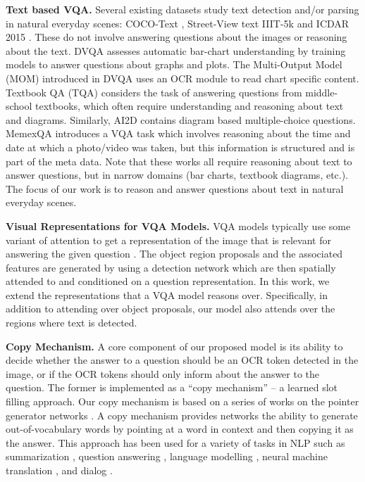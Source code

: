\documentclass[10pt,twocolumn,letterpaper]{article}
\begin{document}
\textbf{Text based VQA.} Several existing datasets study text detection and/or parsing in natural everyday scenes: COCO-Text \cite{veit2016coco}, Street-View text \cite{wang2010word} IIIT-5k \cite{mishra2012scene} and ICDAR 2015 \cite{karatzas2015icdar}. These do not involve answering questions about the images or reasoning about the text.
DVQA \cite{kafle2018dvqa} assesses automatic bar-chart understanding by training models to answer questions about graphs and plots. The Multi-Output Model (MOM) introduced in DVQA  uses an OCR module to read chart specific content. 
Textbook QA (TQA) \cite{kembhavi2017you} considers the task of answering questions from middle-school textbooks, which often require understanding and reasoning about text and diagrams. 
Similarly, AI2D \cite{kembhavi2016diagram} contains diagram based multiple-choice questions. MemexQA \cite{jiang2017memexqa} introduces a VQA task which involves reasoning about the time and date at which a photo/video was taken, but this information is structured and is part of the meta data.
Note that these works all require reasoning about text to answer questions, but in narrow domains (bar charts, textbook diagrams, etc.). The focus of our work is to reason and answer questions about text in natural everyday scenes. 

\textbf{Visual Representations for VQA Models.}
VQA models typically use some variant of attention to get a representation of the image that is relevant for answering the given question \cite{andreas2016neural, fukui2016multimodal,lu2016hierarchical,xu2016ask,yang2016stacked,zhu2016visual7w, jiang2018pythia}.
The object region proposals and the associated features are generated by using a detection network which are then spatially attended to and conditioned on a question representation.
In this work, we extend the representations that a VQA model reasons over. Specifically, in addition to attending over
object proposals, our model also attends over the regions where text is detected. 

\textbf{Copy Mechanism.}
A core component of our proposed model is its ability to decide whether the answer to a question should be an OCR token detected in the image, or if the OCR tokens should only inform about the answer to the question. 
The former is implemented as a ``copy mechanism'' -- a learned slot filling approach.
Our copy mechanism is based on a series of works on
the pointer generator networks \cite{gu2016incorporating,see2017get,merity2016pointer,gulcehre2016pointing,nallapati2016abstractive}. 
A copy mechanism provides networks the ability to generate out-of-vocabulary words by pointing at a word in context and then copying it as the answer. This approach has been used for a variety of tasks in NLP such as summarization \cite{gu2016incorporating, nallapati2016abstractive, see2017get}, question answering \cite{xiong2016dynamic}, language modelling \cite{merity2016pointer}, neural machine translation \cite{gulcehre2016pointing}, and dialog \cite{raghu2018hierarchical}.
%
 \vspace{-2mm}
\end{document}
